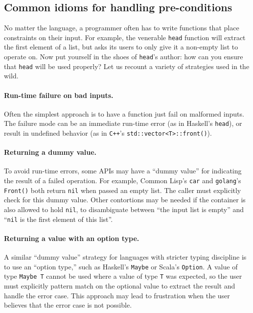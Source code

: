 \documentclass[format=sigplan, review=false, screen=true]{acmart}
\begin{document}
\subsection{Common idioms for handling pre-conditions}

No matter the language, a programmer often has to write functions
that place constraints on their input. For example, the venerable
\texttt{head} function will extract the first element of a list,
but asks its users to only give it a non-empty list to operate on.
Now put yourself in the shoes of \texttt{head}'s author: how can
you ensure that \texttt{head} will be used properly? Let us recount
a variety of strategies used in the wild.

\paragraph{Run-time failure on bad inputs.}
Often the simplest approach is
  to have a function just fail on malformed inputs. The failure mode can
  be an immediate run-time error (as in Haskell's \texttt{head}), or result in
  undefined behavior (as in \texttt{C++}'s \texttt{std::vector<T>::front()}).
  
\paragraph{Returning a dummy value.}
  To avoid run-time errors, some APIs may have a ``dummy value''
  for indicating the result of a failed operation. For example, Common Lisp's
  \texttt{car} and \texttt{golang}'s \texttt{Front()} both return \texttt{nil}
  when passed an empty list. The caller must explicitly check for this dummy
  value. Other contortions may be needed if the container is also allowed to
  hold \texttt{nil}, to disambiguate between ``the input list is empty'' and
  ``\texttt{nil} is the first element of this list''.

\paragraph{Returning a value with an option type.}
  A similar ``dummy value'' strategy
  for languages with stricter typing discipline is to use an ``option type,'' such
  as Haskell's \texttt{Maybe} or Scala's \texttt{Option}. A value of type \texttt{Maybe T}
  cannot be used where a value of type \texttt{T} was expected, so the user must
  explicitly pattern match on the optional value to extract the result and handle the
  error case. This approach may lead to frustration when the user believes that the
  error case is not possible.
  
\end{document}
